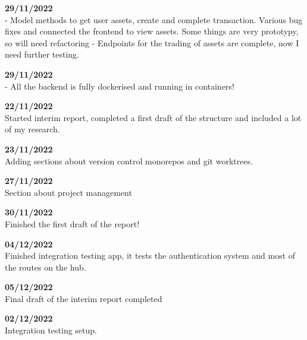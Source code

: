 \documentclass[titlepage]{article}
\begin{document}
\textbf{29/11/2022} \\
 - Model methods to get user assets, create and complete transaction. Various bug fixes and connected the frontend to view assets. Some things are very prototypy, so will need refactoring
 - Endpoints for the trading of assets are complete, now I need further testing.

\textbf{29/11/2022} \\
 - All the backend is fully dockerised and running in containers!

\textbf{22/11/2022} \\
Started interim report, completed a first draft of the structure and included a lot of my research.

\textbf{23/11/2022} \\
Adding sections about version control monorepos and git worktrees.

\textbf{27/11/2022} \\
Section about project management

\textbf{30/11/2022} \\
Finished the first draft of the report!

\textbf{04/12/2022} \\
Finished integration testing app, it tests the authentication system and most of the routes on the hub.

\textbf{05/12/2022} \\
Final draft of the interim report completed

\textbf{02/12/2022} \\
Integration testing setup.
\end{document}
